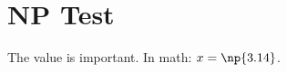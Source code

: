 \documentclass{article}
\begin{document}
\section{NP Test}
The value  is important.
In math: $x = \np{3.14}$.
\end{document}
